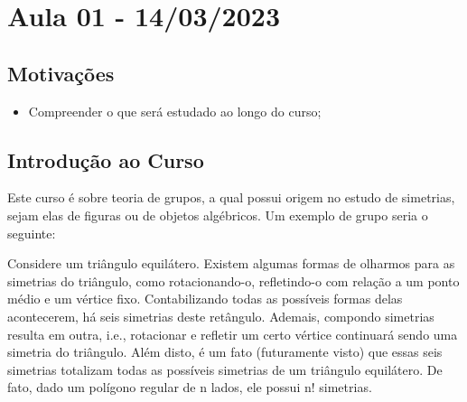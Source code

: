 \documentclass[Algebra/algebra_notes.tex]{subfiles}
\begin{document}
\section{Aula 01 - 14/03/2023}
\subsection{Motivações}
\begin{itemize}
	\item Compreender o que será estudado ao longo do curso;
\end{itemize}
\subsection{Introdução ao Curso}
Este curso é sobre teoria de grupos, a qual possui origem no estudo de simetrias, sejam elas de figuras ou de objetos algébricos.
Um exemplo de grupo seria o seguinte:

Considere um triângulo equilátero. Existem algumas formas de olharmos para as simetrias
do triângulo, como rotacionando-o, refletindo-o com relação a um ponto médio e um vértice fixo. Contabilizando todas as possíveis
formas delas acontecerem, há seis simetrias deste retângulo. Ademais, compondo simetrias resulta em outra, i.e., rotacionar e refletir
um certo vértice continuará sendo uma simetria do triângulo. Além disto, é um fato (futuramente visto) que essas seis simetrias
totalizam todas as possíveis simetrias de um triângulo equilátero. De fato, dado um polígono regular de n lados, ele possui
n! simetrias.
\end{document}
